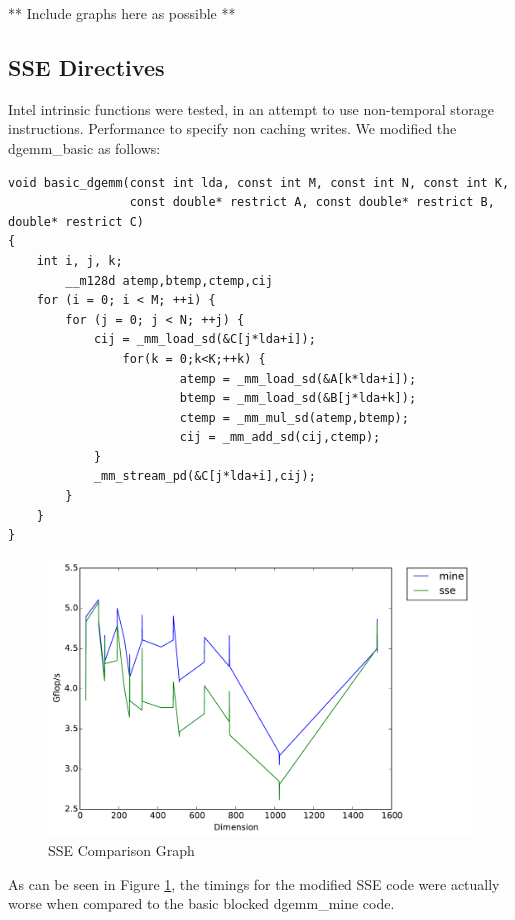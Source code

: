 \documentclass{article}	 %
\begin{document}
** Include graphs here as possible **

\subsection{SSE Directives}

Intel intrinsic functions were tested, in an attempt to use non-temporal storage instructions. Performance to specify non caching writes. We modified the dgemm\_basic as follows:

\begin{verbatim}
void basic_dgemm(const int lda, const int M, const int N, const int K,
                 const double* restrict A, const double* restrict B, double* restrict C)
{
    int i, j, k;
        __m128d atemp,btemp,ctemp,cij
    for (i = 0; i < M; ++i) {
        for (j = 0; j < N; ++j) {
            cij = _mm_load_sd(&C[j*lda+i]);
                for(k = 0;k<K;++k) {
                        atemp = _mm_load_sd(&A[k*lda+i]);
                        btemp = _mm_load_sd(&B[j*lda+k]);
                        ctemp = _mm_mul_sd(atemp,btemp);
                        cij = _mm_add_sd(cij,ctemp);
            }
            _mm_stream_pd(&C[j*lda+i],cij);
        }
    }
}
\end{verbatim}

\begin{figure}[H]
\centering
  \centering
  \includegraphics[width=.6\linewidth]{timing_sse.pdf}
  \caption{SSE Comparison Graph}
  \label{fig:sse}
  \end{figure}
  
  As can be seen in Figure \ref{fig:sse}, the timings for the modified SSE code were actually worse when compared to the basic blocked dgemm\_mine code. 
\end{document}

